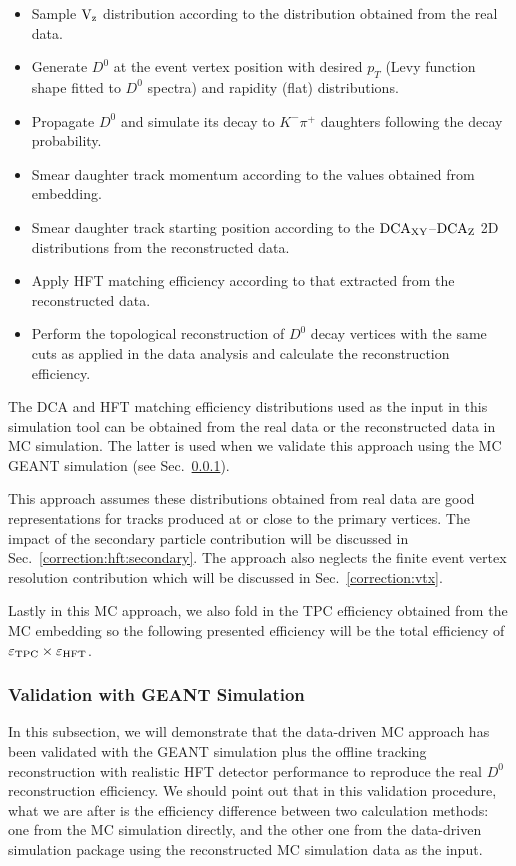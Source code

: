 \documentclass[%
 reprint,	
 amsmath,amssymb,
 aps,
 prc,
]{revtex4-1}
\begin{document}
\begin{itemize}
\item Sample $\textup{V}_\textup{z}$ distribution according to the distribution obtained from the real data.
\item Generate $D^0$ at the event vertex position with desired $p_T$ (Levy function shape fitted to $D^0$ spectra) and rapidity (flat) distributions.
\item Propagate $D^0$ and simulate its decay to $K^-\pi^+$ daughters following the decay probability.
\item Smear daughter track momentum according to the values obtained from embedding.
\item Smear daughter track starting position according to the $\textup{DCA}_{\textup{XY}}$--$\textup{DCA}_\textup{Z}$ 2D distributions from the reconstructed data.
\item Apply HFT matching efficiency according to that extracted from the reconstructed data.
\item Perform the topological reconstruction of $D^0$ decay vertices with the same cuts as applied in the data analysis and calculate the reconstruction efficiency.
\end{itemize}
The DCA and HFT matching efficiency distributions used as the input in this simulation tool can be obtained from the real data or the reconstructed data in MC simulation. The latter is used when we validate this approach using the MC GEANT simulation (see Sec.~\ref{correction:hft:validation}). 

This approach assumes these distributions obtained from real data are good representations for tracks produced at or close to the primary vertices. The impact of the secondary particle contribution will be discussed in Sec.~\ref{correction:hft:secondary}. The approach also neglects the finite event vertex resolution contribution which will be discussed in Sec.~\ref{correction:vtx}.

Lastly in this MC approach, we also fold in the TPC efficiency obtained from the MC embedding so the following presented efficiency will be the total efficiency of $\varepsilon_{\rm TPC}\times\varepsilon_{\rm HFT}$.

\subsubsection{Validation with GEANT Simulation}
\label{correction:hft:validation}

In this subsection, we will demonstrate that the data-driven MC approach has been validated with the GEANT simulation plus the offline tracking reconstruction with realistic HFT detector performance to reproduce the real $D^0$ reconstruction efficiency. We should point out that in this validation procedure, what we are after is the efficiency difference between two calculation methods: one from the MC simulation directly, and the other one from the data-driven simulation package using the reconstructed MC simulation data as the input.
\end{document}
